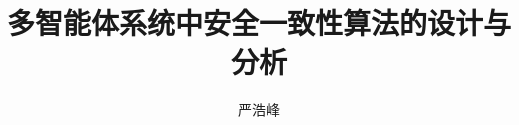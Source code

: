 \documentclass[master, oneside]{hduthesis} %
\title{多智能体系统中安全一致性算法的设计与分析} %
\author{严浩峰}
\institute{计算机学院}         %
\begin{document}
\maketitle

\abstractmatter



\tableofcontents %
%

\mainmatter




\backmatter





%

%
\end{document}
